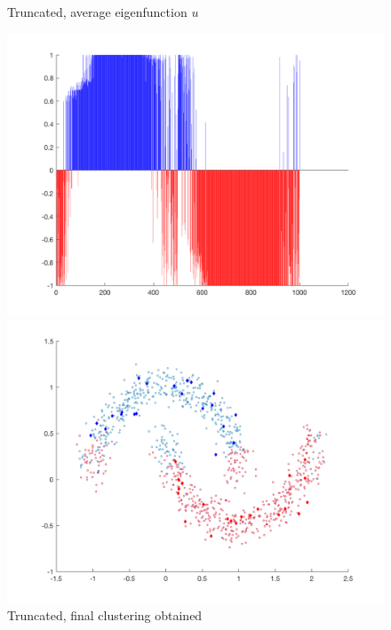 \documentclass{siamart1116}
\begin{document}
\begin{figure}[!htb]
    \begin{minipage}{0.48\textwidth}
        \centering
        \caption{\label{fig:moon_truncated_avg} Truncated, average eigenfunction $u$}
        \includegraphics[width=\linewidth]{graphics/moons/centered_truncated/final_avg.png}
    \end{minipage} \hfill
    \begin{minipage}{0.48\textwidth}
        \centering
        \caption{\label{fig:moon_truncated_scatter} Truncated, final clustering obtained}
        \includegraphics[width=\linewidth]{graphics/moons/centered_truncated/final_scatter.png}
    \end{minipage}
\end{figure}
\end{document}
